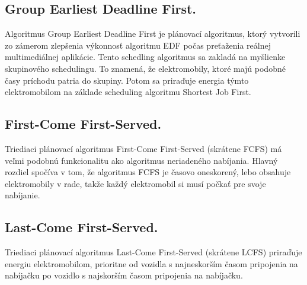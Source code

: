 \subsection{Group Earliest Deadline First.}
Algoritmus Group Earliest Deadline First je plánovací algoritmus, ktorý vytvorili zo zámerom zlepšenia výkonnosť algoritmu EDF počas preťaženia reálnej multimediálnej aplikácie. Tento schedling algoritmus sa zakladá na myšlienke skupinového schedulingu. To znamená, že elektromobily, ktoré majú podobné časy príchodu patria do skupiny. Potom sa priraďuje energia týmto elektromobilom na základe scheduling algoritmu Shortest Job First. \cite{comparisonofalg}











\subsection{First-Come First-Served.}
Triediaci plánovací algoritmus First-Come First-Served (skrátene FCFS) má veľmi podobnú funkcionalitu ako algoritmus neriadeného nabíjania. Hlavný rozdiel spočíva v tom, že algoritmus FCFS je časovo oneskorený, lebo obsahuje elektromobily v rade, takže každý elektromobil si musí počkať pre svoje nabíjanie. \cite{lee2021acnsim}


\subsection{Last-Come First-Served.}
Triediaci plánovací algoritmus Last-Come First-Served (skrátene LCFS) priraďuje energiu elektromobilom, prioritne od vozidla s najneskorším časom pripojenia na nabíjačku po vozidlo s najskorším časom pripojenia na nabíjačku. \cite{lee2021acnsim}

